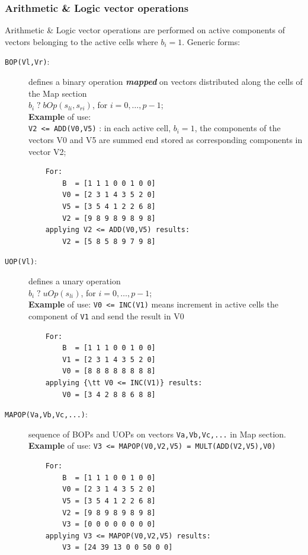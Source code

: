 \subsubsection{Arithmetic \& Logic vector operations}  

Arithmetic \& Logic vector operations are performed on active components of vectors belonging to the active cells where $b_i=1$. Generic forms:
\begin{description}
    \item[{\tt BOP(Vl,Vr)}:] defines a binary operation {\bf {\em mapped}} on vectors distributed along the cells of the Map section   \\ 
    $b_i \; ? \; bOp(s_{l i}, s_{r i})$, for $i = 0, \ldots, p-1$;\\
    {\bf Example} of use: \\ {\tt V2 <= ADD(V0,V5)} : in each active cell, $b_i=1$, the components of the vectors V0 and V5 are summed end stored as corresponding components in vector V2;
    \begin{verbatim}
    For:
        B  = [1 1 1 0 0 1 0 0]
        V0 = [2 3 1 4 3 5 2 0]
        V5 = [3 5 4 1 2 2 6 8]
        V2 = [9 8 9 8 9 8 9 8]
    applying V2 <= ADD(V0,V5) results:
        V2 = [5 8 5 8 9 7 9 8]
    \end{verbatim}
    \item[{\tt UOP(Vl)}:] defines a unary operation  \\ 
    $b_i \; ? \; uOp(s_{l i})$, for $i = 0, \ldots, p-1$; \\
    {\bf Example} of use:  {\tt V0 <= INC(V1)} means increment in active cells the component of {\tt V1} and send the result in V0  \\
    \begin{verbatim}
    For:
        B  = [1 1 1 0 0 1 0 0]
        V1 = [2 3 1 4 3 5 2 0]
        V0 = [8 8 8 8 8 8 8 8]
    applying {\tt V0 <= INC(V1)} results:
        V0 = [3 4 2 8 8 6 8 8]
    \end{verbatim}
    \item[{\tt MAPOP(Va,Vb,Vc,...)}:] sequence of BOPs and UOPs on vectors {\tt Va,Vb,Vc,...} in Map section. \\
    {\bf Example} of use:  {\tt V3 <= MAPOP(V0,V2,V5) = MULT(ADD(V2,V5),V0)} 
    \begin{verbatim}
    For:
        B  = [1 1 1 0 0 1 0 0]
        V0 = [2 3 1 4 3 5 2 0]
        V5 = [3 5 4 1 2 2 6 8]
        V2 = [9 8 9 8 9 8 9 8]
        V3 = [0 0 0 0 0 0 0 0]
    applying V3 <= MAPOP(V0,V2,V5) results:
        V3 = [24 39 13 0 0 50 0 0]
    \end{verbatim}
\end{description}

